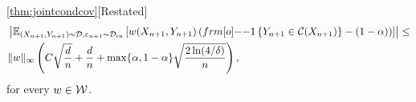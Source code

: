 \begin{customthm}{\ref*{thm:jointcondcov}}[Restated]
\begin{align*}
&\left|\EE_{(X_{n+1},Y_{n+1})\sim \calD, \varepsilon_{n+1} \sim \calD_{\text{rn}}}\qth{w(X_{n+1},Y_{n+1})\pth{\11\sth{Y_{n+1} \in \calC(X_{n+1})}- (1-\alpha)}}\right| \leq \\
&{} 
\|w\|_{\infty} \pth{C \sqrt{\frac{d}{n}} + \frac{d}{n} +\max \{\alpha, 1-\alpha\}\sqrt{\frac{2\ln(4/\delta)}{n}} },
\end{align*}
for every $w \in {\cal W}$.
\begin{comment}
    Let $\alpha, \delta$ be two parameters in $(0,1)$ and let $\calW = \{\Phi(\cdot)^T \beta :\beta \in \RR^d\}$ denote a class of linear weight functions over the basis $\Phi : \calX \times \calY \to \RR^d$, where $\Phi$ is bounded. 
    Let $\{\varepsilon_i\}_{i\in[n+1]}$ be independent real-valued random variables, independent of $\{(X_i,Y_i)\}_{i\in[n+1]}$.
    For a randomized score function $\tS(x,y,\varepsilon)$, consider the following regression:
    \begin{align*}
        \hat{q} \in \arg \min_{w \in \cal W} &\frac{1}{n} \sum_{i=1}^n \ell_\alpha \left(w(X_i,Y_i), \tS\left(X_i,Y_i, \varepsilon_i\right)\right). 
    \end{align*}
    The prediction set, potentially randomized by $\varepsilon_{n+1}$, is given by
    \begin{align*}
        \calC(X_{n+1}) = \left\{y: \tS\left(X_{n+1},y, 
        \varepsilon_{n+1}\right) \leq \hat{q}(X_{n+1},y)\right\}.
    \end{align*}
    Assume $\{(X_i,Y_i, \varepsilon_i)\}_{i\in [n+1]}$ are independent and identically distributed random variables drawn from the distribution $\calD$, and the distribution of $\tS\left(X,Y, \varepsilon\right) \mid \Phi(X,Y)$ is continuous. There exists an absolute constant $C$ such that, with probability at least $1-\delta$ over the randomness of the calibration dataset $\{(X_i,Y_i, \varepsilon_i)\}_{i\in [n]}$, the prediction set $\calC$ satisfies
\begin{align*}
&\left|\EE_{(X_{n+1},Y_{n+1}, \varepsilon_{n+1})\sim \calD}\qth{w(X_{n+1},Y_{n+1})\pth{\11\sth{Y_{n+1} \in \calC(X_{n+1})}- (1-\alpha)}}\right| \leq \\
&{} 
\|w\|_{\infty} \pth{C \sqrt{\frac{d}{n}} + \frac{d}{n} +\max \{\alpha, 1-\alpha\}\sqrt{\frac{2\ln(4/\delta)}{n}} },
\end{align*}
for every $w \in \calW$.
\end{comment}
\end{customthm}
